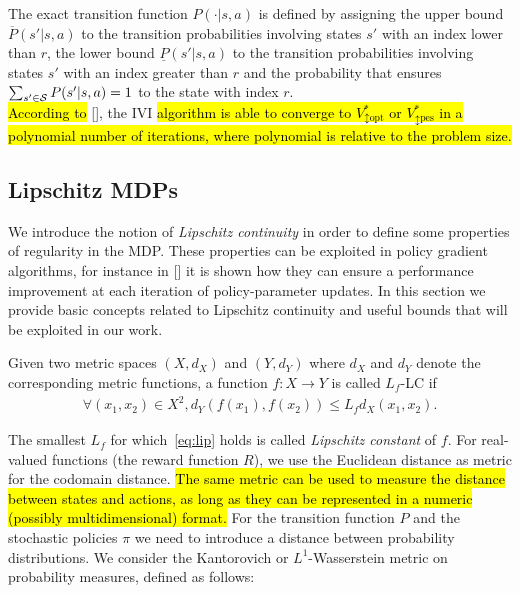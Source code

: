 The exact transition function $P(\cdot|s,a)$ is defined by assigning the upper bound $\overline{P}(s'|s,a)$ to the transition probabilities involving states $s'$ with an index lower than $r$, the lower bound $\underline{P}(s'|s,a)$ to the transition probabilities involving states $s'$ with an index greater than $r$ and the probability that ensures $\sum_{s' \in \mathcal{S}}P(s'|s,a) = 1$ to the state with index $r$.\\
\newline
\hl{According to} [\cite{givan2000bounded}], the \ac{IVI} \hl{algorithm is able to converge to $V^{*}_{\updownarrow \text{opt}}$ or $V^{*}_{\updownarrow \text{pes}}$ in a polynomial number of iterations, where polynomial is relative to the problem size.}

\subsection{Lipschitz \ac{MDPs}} \label{sub:lipmdp}
We introduce the notion of \emph{Lipschitz continuity} in order to define some properties of regularity in the \ac{MDP}. These properties can be exploited in policy gradient algorithms, for instance in [\cite{pirotta2015policy}] it is shown how they can ensure a performance improvement at each iteration of policy-parameter updates. In this section we provide basic concepts related to Lipschitz continuity and useful bounds that will be exploited in our work.
\begin{definition}
Given two metric spaces $(X, d_X)$ and $(Y, d_Y)$ where $d_X$ and $d_Y$ denote the corresponding metric functions, a function $f: X \rightarrow Y$ is called $L_f$-\acf{LC} if
\begin{align} \forall(x_1, x_2) \in X^2, d_Y(f(x_1), f(x_2)) \leq L_f d_X(x_1, x_2). \label{eq:lip} \end{align}
\end{definition}
\noindent The smallest $L_f$ for which~\eqref{eq:lip} holds is called \emph{Lipschitz constant} of $f$. For real-valued functions (\eg the reward function $R$), we use the Euclidean distance as metric for the codomain distance. \hl{The same metric can be used to measure the distance between states and actions, as long as they can be represented in a numeric (possibly multidimensional) format.} For the transition function $P$ and the stochastic policies $\pi$ we need to introduce a distance between probability distributions. We consider the Kantorovich or $L^1$-Wasserstein metric on probability measures, defined as follows:
